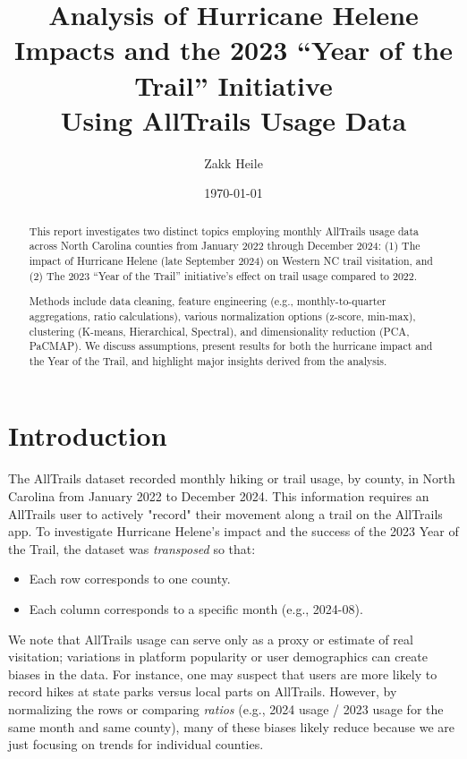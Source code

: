 \documentclass[12pt]{article}
\begin{document}
\title{\textbf{Analysis of Hurricane Helene Impacts and the 2023 ``Year of the Trail'' Initiative \\ Using AllTrails Usage Data}}
\author{Zakk Heile}
\date{\today}
\maketitle

\begin{abstract}
This report investigates two distinct topics employing monthly AllTrails \cite{AllTrails} usage data across North Carolina counties from January 2022 through December 2024: 
(1) The impact of Hurricane Helene (late September 2024) on Western NC trail visitation, and 
(2) The 2023 ``Year of the Trail'' initiative’s effect on trail usage compared to 2022. 

Methods include data cleaning, feature engineering (e.g., monthly-to-quarter aggregations, ratio calculations), various normalization options (z-score, min-max), clustering (K-means, Hierarchical, Spectral), and dimensionality reduction (PCA, PaCMAP). We discuss assumptions, present results for both the hurricane impact and the Year of the Trail, and highlight major insights derived from the analysis.
\end{abstract}

\newpage

\tableofcontents

\newpage

\section{Introduction}
The AllTrails dataset recorded monthly hiking or trail usage, by county, in North Carolina from January 2022 to December 2024. This information requires an AllTrails user to actively "record" their movement along a trail on the AllTrails app. To investigate Hurricane Helene’s impact and the success of the 2023 Year of the Trail, the dataset was \emph{transposed} so that:
\begin{itemize}
    \item Each row corresponds to one county.
    \item Each column corresponds to a specific month (e.g., 2024-08).
\end{itemize}

We note that AllTrails usage can serve only as a proxy or estimate of real visitation; variations in platform popularity or user demographics can create biases in the data. For instance, one may suspect that users are more likely to record hikes at state parks versus local parts on AllTrails. However, by normalizing the rows or comparing \emph{ratios} (e.g., 2024 usage / 2023 usage for the same month and same county), many of these biases likely reduce because we are just focusing on trends for individual counties.  
\end{document}
